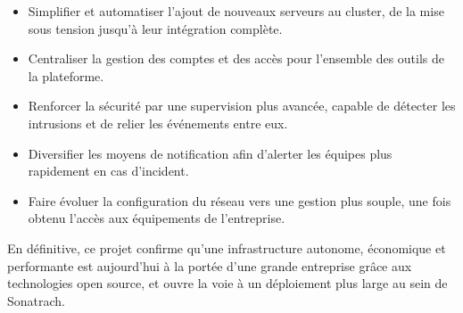 \begin{itemize}

    \item Simplifier et automatiser l'ajout de nouveaux serveurs au cluster, de la mise sous tension jusqu'à leur intégration complète.

    \item Centraliser la gestion des comptes et des accès pour l'ensemble des outils de la plateforme.

    \item Renforcer la sécurité par une supervision plus avancée, capable de détecter les intrusions et de relier les événements entre eux.

    \item Diversifier les moyens de notification afin d'alerter les équipes plus rapidement en cas d'incident.

    \item Faire évoluer la configuration du réseau vers une gestion plus souple, une fois obtenu l'accès aux équipements de l'entreprise.

\end{itemize}

\par En définitive, ce projet confirme qu'une infrastructure autonome, économique et performante est aujourd'hui à la portée d'une grande entreprise grâce aux technologies open source, et ouvre la voie à un déploiement plus large au sein de Sonatrach.\\
